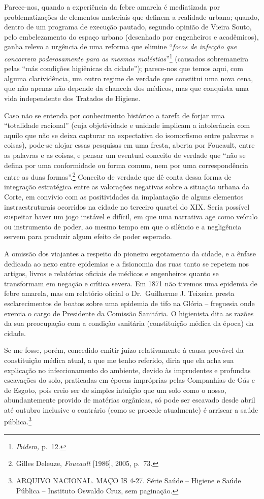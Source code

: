 Parece-nos, quando a experiência da febre amarela é mediatizada por
problematizações de elementos materiais que definem a realidade urbana;
quando, dentro de um programa de execução pautado, segundo opinião de
Vieira Souto, pelo embelezamento do espaço urbano (desenhado por
engenheiros e acadêmicos), ganha relevo a urgência de uma reforma que
elimine ``\emph{focos de infecção que concorrem poderosamente para as
mesmas moléstias}''\footnote{\emph{Ibidem,} p.~12.} (causados
sobremaneira pelas ``más condições higiênicas da cidade''); parece-nos
que temos aqui, com alguma clarividência, um outro regime de verdade que
constitui uma nova cena, que não apenas não depende da chancela dos
médicos, mas que conquista uma vida independente dos Tratados de
Higiene.

Caso não se entenda por conhecimento histórico a tarefa de forjar uma
``totalidade racional'' (cuja objetividade e unidade implicam a
intolerância com aquilo que não se deixa capturar na expectativa do
isomorfismo entre palavras e coisas), pode-se alojar essas pesquisas em
uma fresta, aberta por Foucault, entre as palavras e as coisas, e pensar
um eventual conceito de verdade que ``não se defina por uma conformidade
ou forma comum, nem por uma correspondência entre as duas
formas''.\footnote{Gilles Deleuze, \emph{Foucault} {[}1986{]}, 2005,
  p.~73.} Conceito de verdade que dê conta dessa forma de integração
estratégica entre as valorações negativas sobre a situação urbana da
Corte, em convívio com as positividades da implantação de alguns
elementos instraestruturais ocorridos na cidade no terceiro quartel do
XIX. Seria possível suspeitar haver um jogo instável e difícil, em que
uma narrativa age como veículo ou instrumento de poder, ao mesmo tempo
em que o silêncio e a negligência servem para produzir algum efeito de
poder esperado.

A omissão dos viajantes a respeito do pioneiro esgotamento da cidade, e
a ênfase dedicada ao nexo entre epidemias e a fisionomia das ruas tanto
se repetem nos artigos, livros e relatórios oficiais de médicos e
engenheiros quanto se transformam em negação e crítica severa. Em 1871
não tivemos uma epidemia de febre amarela, mas em relatório oficial o
Dr.~Guilherme J. Teixeira presta esclarecimentos de boatos sobre uma
epidemia de tifo na Glória -- freguesia onde exercia o cargo de
Presidente da Comissão Sanitária. O higienista dita as razões da sua
preocupação com a condição sanitária (constituição médica da época) da
cidade.

Se me fosse, porém, concedido emitir juízo relativamente à causa
provável da constituição médica atual, a que me tenho referido, diria
que ela acha sua explicação no infeccionamento do ambiente, devido às
imprudentes e profundas escavações do solo, praticadas em épocas
impróprias pelas Companhias de Gás e de Esgoto, pois creio ser de
simples intuição que um solo como o nosso, abundantemente provido de
matérias orgânicas, só pode ser escavado desde abril até outubro
inclusive o contrário (como se procede atualmente) é arriscar a saúde
pública.\footnote{ARQUIVO NACIONAL. MAÇO IS 4-27. Série Saúde -- Higiene
  e Saúde Pública -- Instituto Oswaldo Cruz, sem paginação.}

